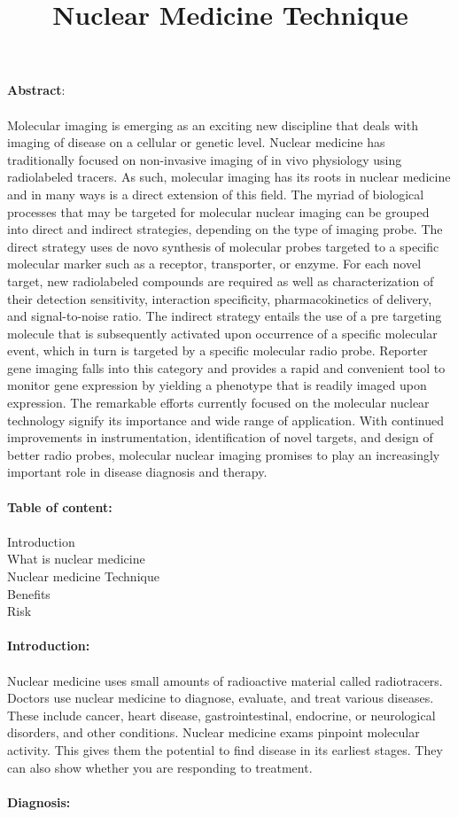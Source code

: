 \documentclass[12pt]{article}
\title{Nuclear Medicine Technique}
\date{}
\begin{document}
\maketitle
\noindent
\textbf{\large Abstract}:\\ \\ \large Molecular imaging is emerging as an exciting new discipline that deals with imaging of disease on a cellular or genetic level. Nuclear medicine has traditionally focused on non-invasive imaging of in vivo physiology using radiolabeled tracers. As such, molecular imaging has its roots in nuclear medicine and in many ways is a direct extension of this field. The myriad of biological processes that may be targeted for molecular nuclear imaging can be grouped into direct and indirect strategies, depending on the type of imaging probe. The direct strategy uses de novo synthesis of molecular probes targeted to a specific molecular marker such as a receptor, transporter, or enzyme. For each novel target, new radiolabeled compounds are required as well as characterization of their detection sensitivity, interaction specificity, pharmacokinetics of delivery, and signal-to-noise ratio. The indirect strategy entails the use of a pre targeting molecule that is subsequently activated upon occurrence of a specific molecular event, which in turn is targeted by a specific molecular radio probe. Reporter gene imaging falls into this category and provides a rapid and convenient tool to monitor gene expression by yielding a phenotype that is readily imaged upon expression. The remarkable efforts currently focused on the molecular nuclear technology signify its importance and wide range of application. With continued improvements in instrumentation, identification of novel targets, and design of better radio probes, molecular nuclear imaging promises to play an increasingly important role in disease diagnosis and therapy.
\noindent
\\ \\ \textbf{\large Table of content:}
\\ \\Introduction \\ What is nuclear medicine \\ Nuclear medicine Technique \\  Benefits \\ Risk \\ \\ \textbf{\large Introduction:} \\ \\ Nuclear medicine uses small amounts of radioactive material called radiotracers. Doctors use nuclear medicine to diagnose, evaluate, and treat various diseases. These include cancer, heart disease, gastrointestinal, endocrine, or neurological disorders, and other conditions. Nuclear medicine exams pinpoint molecular activity. This gives them the potential to find disease in its earliest stages. They can also show whether you are responding to treatment.
\\ \noindent
\\ \textbf{\large Diagnosis:}
\end{document}
